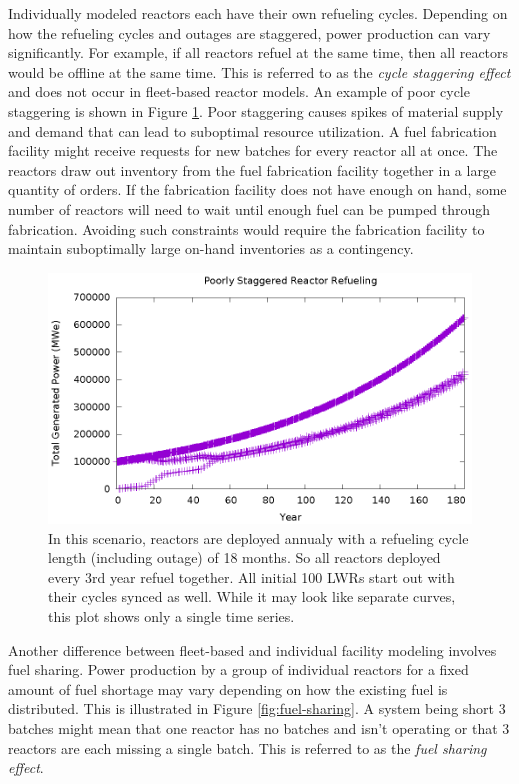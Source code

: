 \documentclass{style}
\begin{document}
Individually modeled reactors each have their own refueling cycles.  Depending
on how the refueling cycles and outages are staggered, power production can
vary significantly.  For example, if all reactors refuel at the same time,
then all reactors would be offline at the same time.  This is referred to as
the \emph{cycle staggering effect} and does not occur in fleet-based reactor
models.  An example of poor cycle staggering is shown in Figure
\ref{fig:sync-cycle}.  Poor staggering causes spikes of material supply and
demand that can lead to suboptimal resource utilization.  A fuel fabrication
facility might receive requests for new batches for every reactor all at once.
The reactors draw out inventory from the fuel fabrication facility together in
a large quantity of orders.  If the fabrication facility does not have enough
on hand, some number of reactors will need to wait until enough fuel can be
pumped through fabrication.  Avoiding such constraints would require the
fabrication facility to maintain suboptimally large on-hand inventories as a
contingency.

\begin{figure}[h]
    \centering
    \includegraphics[width=1.0\columnwidth]{exp2/sync-cycle.eps}
    \caption[The cycle staggering effect]{
        In this scenario, reactors are deployed annualy with a refueling cycle
        length (including outage) of 18 months.  So all reactors deployed
        every 3rd year refuel together.  All initial 100 LWRs start out with
        their cycles synced as well.  While it may look like separate curves,
        this plot shows only a single time series.
    }
    \label{fig:sync-cycle}
\end{figure}

Another difference between fleet-based and individual facility modeling
involves fuel sharing.  Power production by a group of individual reactors for
a fixed amount of fuel shortage may vary depending on how the existing fuel is
distributed.  This is illustrated in Figure \ref{fig:fuel-sharing}.  A system
being short 3 batches might mean that one reactor has no batches and isn't
operating or that 3 reactors are each missing a single batch.  This is
referred to as the \emph{fuel sharing effect}.
\end{document}
